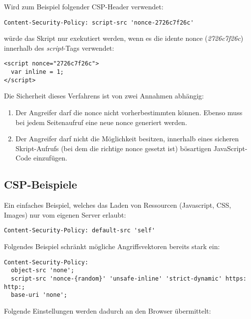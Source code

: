 Wird zum Beispiel folgender CSP-Header verwendet:

\begin{verbatim}
Content-Security-Policy: script-src 'nonce-2726c7f26c'
\end{verbatim}

würde das Skript nur exekutiert werden, wenn es die idente nonce (\textit{2726c7f26c}) innerhalb des \textit{script}-Tags verwendet:

\begin{verbatim}
<script nonce="2726c7f26c">
  var inline = 1;
</script>
\end{verbatim}

Die Sicherheit dieses Verfahrens ist von zwei Annahmen abhängig:

\begin{enumerate}
	\item Der Angreifer darf die nonce nicht vorherbestimmten können. Ebenso muss bei jedem Seitenaufruf eine neue nonce generiert werden.
	\item Der Angreifer darf nicht die Möglichkeit besitzen, innerhalb eines sicheren Skript-Aufrufs (bei dem die richtige nonce gesetzt ist) bösartigen JavaScript-Code einzufügen.
\end{enumerate}

\subsection{CSP-Beispiele}

Ein einfaches Beispiel, welches das Laden von Ressourcen (Javascript, CSS, Images) nur vom eigenen Server erlaubt:

\begin{verbatim}
Content-Security-Policy: default-src 'self'
\end{verbatim}

Folgendes Beispiel schränkt mögliche Angriffsvektoren bereits stark ein:

\begin{verbatim}
Content-Security-Policy:
  object-src 'none';
  script-src 'nonce-{random}' 'unsafe-inline' 'strict-dynamic' https: http:;
  base-uri 'none';
\end{verbatim}

Folgende Einstellungen werden dadurch an den Browser übermittelt:

